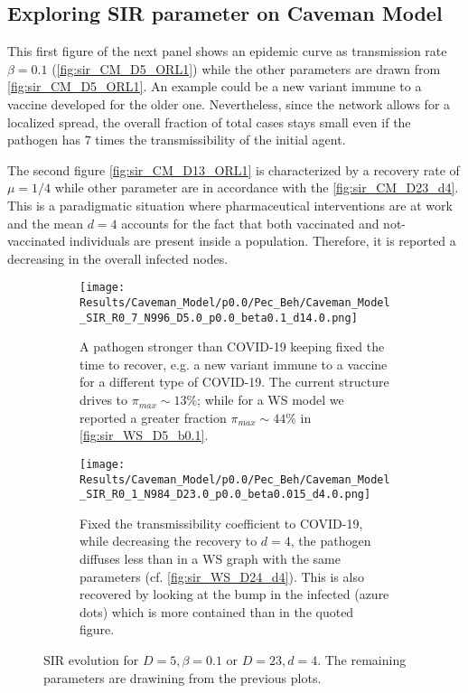 \documentclass[a4paper,10pt,twoside]{book} %
\theoremstyle{definition}
\begin{document}
\clearpage
\subsection*{Exploring SIR parameter on Caveman Model}
This first figure of the next panel shows an epidemic curve as transmission rate $\beta = 0.1$ (\autoref{fig:sir_CM_D5_ORL1}) while the other parameters are drawn from \autoref{fig:sir_CM_D5_ORL1}. An example could be a new variant immune to a vaccine developed for the older one. Nevertheless, since the network allows for a localized spread, the overall fraction of total cases stays small even if the pathogen has $7$ times the transmissibility of the initial agent.

The second figure \autoref{fig:sir_CM_D13_ORL1} is characterized by a recovery rate of $ \mu = 1/4$ while other parameter are in accordance with the \autoref{fig:sir_CM_D23_d4}. This is a paradigmatic situation where pharmaceutical interventions are at work and the mean $ d = 4$ accounts for the fact that both vaccinated and not-vaccinated individuals are present inside a population. Therefore, it is reported a decreasing in the overall infected nodes.   

\begin{figure}[htbp]
	\centering
	\begin{subfigure}{0.8\linewidth}
		\texttt{[image: Results/Caveman\_Model/p0.0/Pec\_Beh/Caveman\_Model\_SIR\_R0\_7\_N996\_D5.0\_p0.0\_beta0.1\_d14.0.png]}
		\caption{A pathogen stronger than COVID-19 keeping fixed the time to recover, e.g. a new variant immune to a vaccine for a different type of COVID-19. The current structure drives to $ \pi_{max} \sim 13\%$; while for a WS model we reported a greater fraction $ \pi_{max} \sim 44\%$ in \autoref{fig:sir_WS_D5_b0.1}.}
		\label{fig:sir_CM_D5_OR1_d14_b0.1}
	\end{subfigure}
	\par\bigskip
	\centering
	\begin{subfigure}{0.8\linewidth}
		\texttt{[image: Results/Caveman\_Model/p0.0/Pec\_Beh/Caveman\_Model\_SIR\_R0\_1\_N984\_D23.0\_p0.0\_beta0.015\_d4.0.png]}
		\caption{Fixed the transmissibility coefficient to COVID-19, while decreasing the recovery to $d = 4$, the pathogen diffuses less than in a WS graph with the same parameters (cf. \autoref{fig:sir_WS_D24_d4}). This is also recovered by looking at the bump in the infected (azure dots) which is more contained than in the quoted figure.}
		\label{fig:sir_CM_D23_d4}
	\end{subfigure}
	\caption{SIR evolution for $D = 5, \beta = 0.1$ or $ D=23,d=4$. The remaining parameters are drawining from the previous plots.}
	\label{fig:sir_CMD4b0.1_D23d4}
\end{figure}
\end{document}
